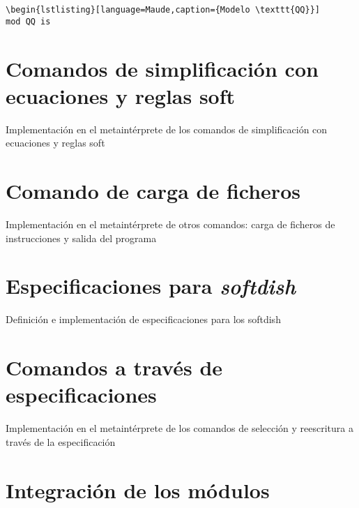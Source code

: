 \begin{lstlisting}[label=ALLOPS,language=Maude,caption={Módulo \texttt{ALLOPS}}]
\begin{lstlisting}[language=Maude,caption={Modelo \texttt{QQ}}]
mod QQ is
\end{lstlisting}






\section{Comandos de simplificación con ecuaciones y reglas soft}

Implementación en el metaintérprete de los comandos de simplificación con ecuaciones y reglas soft



\section{Comando de carga de ficheros}

Implementación en el metaintérprete de otros comandos: carga de ficheros de instrucciones y salida del programa



\section{Especificaciones para \textit{softdish}}
\label{sec:EspecificacionesSS}

Definición e implementación de especificaciones para los softdish



\section{Comandos a través de especificaciones}

Implementación en el metaintérprete de los comandos de selección y reescritura a través de la especificación



\section {Integración de los módulos}
 
